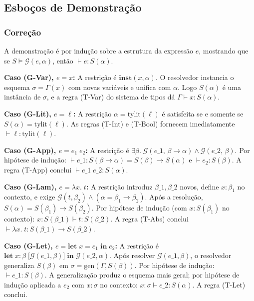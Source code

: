   \subsection{Esboços de Demonstração}

  \subsubsection{Correção}

  A demonstração é por indução sobre a estrutura da expressão \(e\),
  mostrando que se \(S \models \mathcal{G}(e, \alpha)\), então \(\vdash
  e : S(\alpha)\).

  \textbf{Caso (G-Var), \(e = x\):} A restrição é \(\mathbf{inst}(x,
  \alpha)\). O resolvedor instancia o esquema \(\sigma = \Gamma(x)\)
  com novas variáveis e unifica com \(\alpha\). Logo \(S(\alpha)\) é
  uma instância de \(\sigma\), e a regra (T-Var) do sistema de tipos dá
  \(\Gamma \vdash x : S(\alpha)\).

  \textbf{Caso (G-Lit), \(e = \ell\):} A restrição
  \(\alpha = \mathrm{tylit}(\ell)\) é
  satisfeita se e somente se \(S(\alpha) =
  \mathrm{tylit}(\ell)\). As regras (T-Int) e (T-Bool)
  fornecem imediatamente \(\vdash \ell : \mathrm{tylit}(\ell)\).

  \textbf{Caso (G-App), \(e = e_1\; e_2\):} A restrição é
  \(\exists \beta.\;
    \mathcal{G}(e\_1,\, \beta \to \alpha) \wedge
  \mathcal{G}(e\_2,\, \beta)\). Por hipótese
  de indução: \(\vdash e\_1 : S(\beta \to \alpha) =
  S(\beta) \to S(\alpha)\) e \(\vdash e_2 : S(\beta)\). A
  regra (T-App) conclui \(\vdash e\_1\; e\_2
  : S(\alpha)\).

  \textbf{Caso (G-Lam), \(e = \lambda x.\; t\):} A restrição introduz
  \(\beta\_1, \beta\_2\) novos, define \(x
  : \beta_1\) no contexto, e exige \(\mathcal{G}(t, \beta_2) \wedge
  (\alpha = \beta_1 \to \beta_2)\). Após a resolução, \(S(\alpha) =
  S(\beta_1) \to S(\beta_2)\). Por hipótese de indução (com \(x :
  S(\beta_1)\) no contexto): \(x : S(\beta\_1) \vdash t :
  S(\beta\_2)\). A regra (T-Abs) conclui
  \(\vdash \lambda x.\; t : S(\beta\_1) \to
  S(\beta\_2)\).

  \textbf{Caso (G-Let), \(e = \mathbf{let}\; x = e_1\; \mathbf{in}\;
  e_2\):} A restrição é \(\mathbf{let}\; x :
    \beta\; {[}\mathcal{G}(e\_1, \beta){]}\;
  \mathbf{in}\; \mathcal{G}(e\_2, \alpha)\).
  Após resolver \(\mathcal{G}(e\_1, \beta)\),
  o resolvedor generaliza \(S(\beta)\) em \(\sigma =
  \mathrm{gen}(\Gamma, S(\beta))\). Por hipótese de
  indução: \(\vdash e\_1 : S(\beta)\). A
  generalização produz o esquema mais geral; por hipótese de indução
  aplicada a \(e_2\) com \(x : \sigma\) no contexto: \(x :
  \sigma \vdash e\_2 : S(\alpha)\). A regra (T-Let) conclui.

